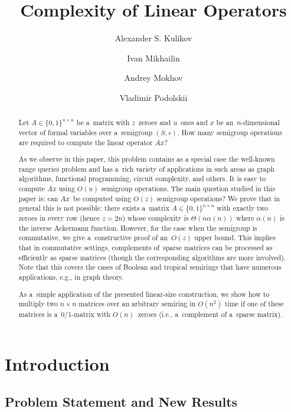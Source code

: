 \documentclass[a4paper,UKenglish,cleveref, autoref]{lipics-v2019}
\author{Alexander S. Kulikov}{Steklov Mathematical Institute at St.~Petersburg, Russian Academy of Sciences \and St.~Petersburg State University \and \url{https://logic.pdmi.ras.ru/~kulikov/}}{kulikov@logic.pdmi.ras.ru}{https://orcid.org/0000-0002-5656-0336}{The results presented in Section~\ref{sec-commutative} are supported by Russian Science Foundation (18-71-10042).}
\author{Ivan Mikhailin}{University of California, San Diego}{imikhail@eng.ucsd.edu}{}{}
\author{Andrey Mokhov}{School of Engineering, Newcastle University, UK}{andrey.mokhov@ncl.ac.uk}{}{}
\author{Vladimir Podolskii}{Steklov Mathematical Institute, Russian Academy of Sciences  
\and \url{http://www.mi-ras.ru/~podolskii/}}{podolskii@mi-ras.ru}{http://orcid.org/0000-0001-7154-138X}{The results presented in Section~\ref{sec-non-commutative} are supported by Russian Science Foundation (16-11-10252).}
\title{Complexity of Linear Operators}
\begin{document}
\maketitle

\begin{abstract}
Let $A \in \{0,1\}^{n \times n}$ be a~matrix with $z$~zeroes
and $u$~ones and $x$ be an~$n$-dimensional vector of
formal variables over a~semigroup $(S, \circ)$.
How many semigroup operations are required to compute the linear operator $Ax$?

As we observe in this paper, this problem contains as a special case the well-known
range queries problem and has a~rich variety of applications in
such areas as graph algorithms, functional programming, circuit complexity,
and others. It is easy to compute $Ax$ using $O(u)$ semigroup
operations.
The main question studied in this paper is:
can $Ax$~be computed using $O(z)$ semigroup operations?
We prove that in general this is not possible: there exists
a~matrix $A \in \{0,1\}^{n \times n}$ with exactly two zeroes in every row
(hence $z=2n$) whose complexity is $\Theta(n\alpha(n))$
where $\alpha(n)$ is the inverse Ackermann function.
However, for the case when the semigroup is commutative,
we give a~constructive proof of an~$O(z)$ upper bound.
This implies that in commutative settings, complements of~sparse
matrices can
be processed as efficiently as sparse matrices (though the
corresponding
algorithms are more involved). Note that this covers the
cases of Boolean and tropical semirings that have numerous
applications, e.g., in graph theory.

As a~simple application of the presented linear-size construction,
we show
how to multiply two $n\times n$ matrices over an arbitrary
semiring in $O(n^2)$
time if one of these matrices is a~0/1-matrix with $O(n)$~zeroes
(i.e., a~complement of a~sparse matrix).
\end{abstract}


\section{Introduction}
\subsection{Problem Statement and New Results}
\end{document}
